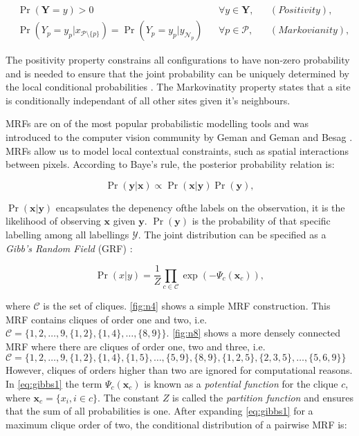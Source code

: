 \begin{align}
	&\Pr(\mathbf{Y}=y) > 0&  &\forall y \in \mathbf{Y},& &(Positivity),&\\
	&\Pr(Y_p=y_p | x_{\mathcal{P}\setminus \{p\}}) = \Pr(Y_p=y_p | y_{\mathcal{N}_p})&  &\forall p \in \mathcal{P},& &(Markovianity),&
\end{align}

The positivity property constrains all configurations to have non-zero probability and is needed to ensure that the joint probability can be uniquely determined by the local conditional probabilities \citep{Smith1997}. The Markovinatity property states that a site is conditionally independant of all other sites given it's neighbours.

MRFs are on of the most popular probabilistic modelling tools and was introduced to the computer vision community by Geman and Geman \citep{Geman1984} and Besag \citep{Besag1986}. MRFs allow us to model local contextual constraints, such as spatial interactions between pixels. According to Baye's rule, the posterior probability relation is:

\begin{equation}
	\Pr(\mathbf{y}|\mathbf{x}) \propto \Pr(\mathbf{x}|\mathbf{y})\Pr(\mathbf{y}),
\end{equation}

$\Pr(\mathbf{x}|\mathbf{y})$ encapsulates the depenency ofthe labels on the observation, it is the likelihood of observing $\mathbf{x}$ given $\mathbf{y}$. $\Pr(\mathbf{y})$ is the probability of that specific labelling among all labellings $\mathcal{Y}$. The joint distribution can be specified as a \textit{Gibb's Random Field} (GRF) \citep{Lafferty2001,HammersleyClifford1971}:

\begin{equation}
	\Pr(x|y) = \frac{1}{Z}\prod_{c \in \mathcal{C}}\exp(-\Psi_c(\mathbf{x}_c)),
	\label{eq:gibbs1}
\end{equation}

where $\mathcal{C}$ is the set of cliques. \autoref{fig:n4} shows a simple MRF construction. This MRF contains cliques of order one and two, i.e. $\mathcal{C} = \{1, 2, \ldots, 9, \{1,2\}, \{1,4\}, \ldots, \{8,9\}\}$. \autoref{fig:n8} shows a more densely connected MRF where there are cliques of order one, two and three, i.e. $\mathcal{C} = \{1, 2, \ldots, 9, \{1,2\}, \{1,4\}, \{1,5\}, \ldots, \{5,9\}, \{8,9\}, \{1,2,5\}, \{2,3,5\}, \ldots, \{5,6,9\} \}$ However, cliques of orders higher than two are ignored for computational reasons. In \autoref{eq:gibbs1} the term $\Psi_c(\mathbf{x}_c)$ is known as a \textit{potential function} for the clique $c$, where $\mathbf{x}_c = \{x_i, i \in c\}$. The constant $Z$ is called the \textit{partition function} and ensures that the sum of all probabilities is one. After expanding \autoref{eq:gibbs1} for a maximum clique order of two, the conditional distribution of a pairwise MRF is:

